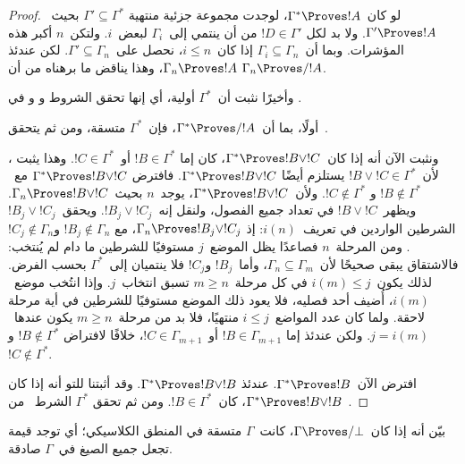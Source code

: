 \documentclass[../../../include/open-logic-section]{subfiles}
\begin{document}
\begin{proof}
  لو كان~$\Gamma^* \Proves !A$، لوجدت مجموعة جزئية منتهية
  $\Gamma'\subseteq\Gamma^*$ بحيث~$\Gamma'\Proves !A$. ولا بد لكل
  $!D\in\Gamma'$ من أن ينتمي إلى~$\Gamma_i$ لبعض~$i$. ولتكن~$n$ أكبر
  هذه المؤشرات. وبما أن~$\Gamma_i\subseteq\Gamma_n$ إذا كان~$i\leq n$،
  نحصل على~$\Gamma'\subseteq\Gamma_n$. لكن عندئذ
  $\Gamma_n\Proves !A$، وهذا يناقض ما برهناه من أن
  $\Gamma_n\Proves/!A$.

  وأخيرًا نثبت أن~$\Gamma^*$ أولية، أي إنها تحقق الشروط
   و و في
  .

  أولًا، بما أن~$\Gamma^*\Proves/!A$، فإن~$\Gamma^*$ متسقة، ومن ثم
  يتحقق~.

  ونثبت الآن أنه إذا كان~$\Gamma^*\Proves !B\lor !C$، كان إما
  $!B\in\Gamma^*$ أو~$!C\in\Gamma^*$. وهذا يثبت
  ، لأن~$!B\lor !C\in\Gamma^*$ يستلزم أيضًا
  $\Gamma^*\Proves !B\lor !C$. فافترض
  $\Gamma^*\Proves !B\lor !C$ مع~$!B\notin\Gamma^*$ و
  $!C\notin\Gamma^*$. ولأن~$\Gamma^*\Proves !B\lor !C$، يوجد~$n$
  بحيث~$\Gamma_n\Proves !B\lor !C$. ويظهر~$!B\lor !C$ في تعداد جميع
  الفصول، ولنقل إنه~$!B_j\lor !C_j$. ويحقق~$!B_j\lor !C_j$ الشرطين
  الواردين في تعريف~$i(n)$: إذ
  $\Gamma_n\Proves !B_j\lor !C_j$، مع
  $!B_j\notin\Gamma_n$ و$!C_j\notin\Gamma_n$. ومن المرحلة~$n$ فصاعدًا
  يظل الموضع~$j$ مستوفيًا للشرطين ما دام لم يُنتخب: فالاشتقاق يبقى
  صحيحًا لأن~$\Gamma_n\subseteq\Gamma_m$، وأما~$!B_j$ و$!C_j$ فلا
  ينتميان إلى~$\Gamma^*$ بحسب الفرض. لذلك يكون~$i(m)\leq j$ في كل
  مرحلة~$m\geq n$ تسبق انتخاب~$j$. وإذا انتُخب موضع~$i(m)$، أُضيف
  أحد فصليه، فلا يعود ذلك الموضع مستوفيًا للشرطين في أية مرحلة لاحقة.
  ولما كان عدد المواضع~$i\leq j$ منتهيًا، فلا بد من مرحلة~$m\geq n$
  يكون عندها~$j=i(m)$. ولكن عندئذ إما
  $!B\in\Gamma_{m+1}$ أو~$!C\in\Gamma_{m+1}$، خلافًا لافتراض
  $!B\notin\Gamma^*$ و$!C\notin\Gamma^*$.

  افترض الآن~$\Gamma^*\Proves !B$. عندئذ
  $\Gamma^*\Proves !B\lor !B$. وقد أثبتنا للتو أنه إذا كان
  $\Gamma^*\Proves !B\lor !B$، كان~$!B\in\Gamma^*$. ومن ثم تحقق
  $\Gamma^*$ الشرط~ من~.
\end{proof}

\begin{prob}
بيّن أنه إذا كان~$\Gamma \Proves/ \bot$، كانت~$\Gamma$ متسقة في
المنطق الكلاسيكي؛ أي توجد قيمة تجعل جميع الصيغ في~$\Gamma$ صادقة.
\end{prob}
\end{document}

